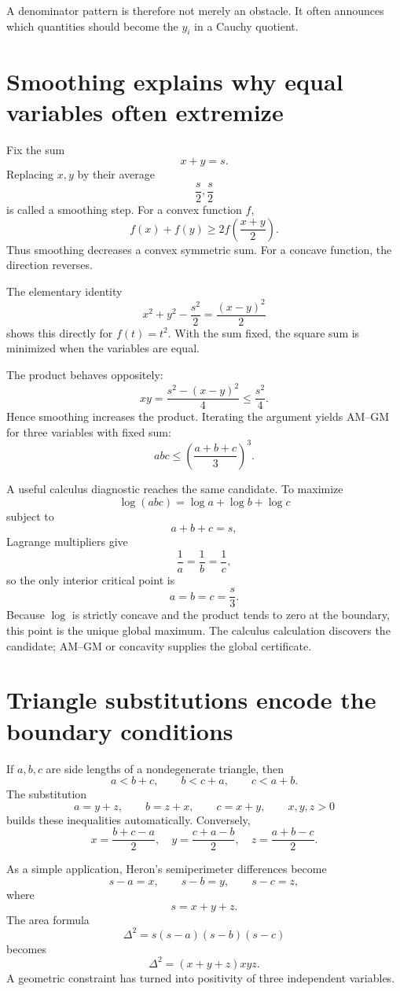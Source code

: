 A denominator pattern is therefore not merely an obstacle.  It often announces which quantities should become the \(y_i\) in a Cauchy quotient.

\section{Smoothing explains why equal variables often extremize}

Fix the sum
\[
  x+y=s.
\]
Replacing \(x,y\) by their average
\[
  \frac{s}{2},\frac{s}{2}
\]
is called a smoothing step.  For a convex function \(f\),
\[
  f(x)+f(y)
  \ge2f\left(\frac{x+y}{2}\right).
\]
Thus smoothing decreases a convex symmetric sum.  For a concave function, the direction reverses.

The elementary identity
\[
  x^2+y^2-\frac{s^2}{2}
  =\frac{(x-y)^2}{2}
\]
shows this directly for \(f(t)=t^2\).  With the sum fixed, the square sum is minimized when the variables are equal.

The product behaves oppositely:
\[
  xy
  =\frac{s^2-(x-y)^2}{4}
  \le\frac{s^2}{4}.
\]
Hence smoothing increases the product.  Iterating the argument yields AM--GM for three variables with fixed sum:
\[
  abc\le\left(\frac{a+b+c}{3}\right)^3.
\]

A useful calculus diagnostic reaches the same candidate.  To maximize
\[
  \log(abc)=\log a+\log b+\log c
\]
subject to
\[
  a+b+c=s,
\]
Lagrange multipliers give
\[
  \frac1a=\frac1b=\frac1c,
\]
so the only interior critical point is
\[
  a=b=c=\frac{s}{3}.
\]
Because \(\log\) is strictly concave and the product tends to zero at the boundary, this point is the unique global maximum.  The calculus calculation discovers the candidate; AM--GM or concavity supplies the global certificate.

\section{Triangle substitutions encode the boundary conditions}

If \(a,b,c\) are side lengths of a nondegenerate triangle, then
\[
  a<b+c,
  \qquad
  b<c+a,
  \qquad
  c<a+b.
\]
The substitution
\[
  a=y+z,
  \qquad
  b=z+x,
  \qquad
  c=x+y,
  \qquad x,y,z>0
\]
builds these inequalities automatically.  Conversely,
\[
  x=\frac{b+c-a}{2},
  \quad
  y=\frac{c+a-b}{2},
  \quad
  z=\frac{a+b-c}{2}.
\]

As a simple application, Heron's semiperimeter differences become
\[
  s-a=x,
  \qquad
  s-b=y,
  \qquad
  s-c=z,
\]
where
\[
  s=x+y+z.
\]
The area formula
\[
  \Delta^2=s(s-a)(s-b)(s-c)
\]
becomes
\[
  \Delta^2=(x+y+z)xyz.
\]
A geometric constraint has turned into positivity of three independent variables.

